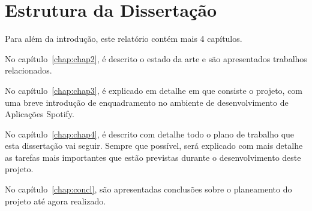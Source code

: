 \section{Estrutura da Dissertação} \label{sec:struct}

Para além da introdução, este relatório contém mais 4 capítulos.

No capítulo~\ref{chap:chap2}, é descrito o estado da arte e são
apresentados trabalhos relacionados.

No capítulo~\ref{chap:chap3}, é explicado em detalhe em que consiste o projeto, com uma breve introdução de enquadramento no ambiente de desenvolvimento de Aplicações Spotify.

No capítulo~\ref{chap:chap4}, é descrito com detalhe todo o plano de trabalho que esta dissertação vai seguir. 
Sempre que possível, será explicado com mais detalhe as tarefas mais importantes que estão previstas durante o desenvolvimento deste projeto.

No capítulo~\ref{chap:concl}, são apresentadas conclusões sobre o planeamento do projeto até agora realizado.
